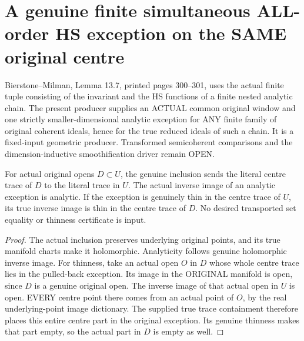\section{A genuine finite simultaneous ALL-order HS exception on the SAME original centre}

Bierstone--Milman\cite{bierstone-milman97-invent-math}, Lemma 13.7,
printed pages 300--301, uses the actual finite tuple consisting of the
invariant and the HS functions of a finite nested analytic chain.
The present producer supplies an ACTUAL common original window and one
strictly smaller-dimensional analytic exception for ANY finite family of
original coherent ideals, hence for the true reduced ideals of such a
chain. It is a fixed-input geometric producer. Transformed semicoherent
comparisons and the dimension-inductive smoothification driver remain OPEN.

\begin{lemma}
\label{hir:actual-original-open-inclusion-analytic-thin-exception}
\leanok
For actual original opens $D\subset U$, the genuine inclusion sends the
literal centre trace of $D$ to the literal trace in $U$. The actual inverse
image of an analytic exception is analytic. If the exception is genuinely
thin in the centre trace of $U$, its true inverse image is thin in the
centre trace of $D$. No desired transported set equality or thinness
certificate is input.
\end{lemma}
\begin{proof}
The actual inclusion preserves underlying original points, and its true
manifold charts make it holomorphic. Analyticity follows genuine
holomorphic inverse image. For thinness, take an actual open $O$ in $D$
whose whole centre trace lies in the pulled-back exception. Its image in
the ORIGINAL manifold is open, since $D$ is a genuine original open.
The inverse image of that actual open in $U$ is open. EVERY centre point
there comes from an actual point of $O$, by the real underlying-point
image dictionary. The supplied true trace containment therefore places
this entire centre part in the original exception. Its genuine thinness
makes that part empty, so the actual part in $D$ is empty as well.
\end{proof}

